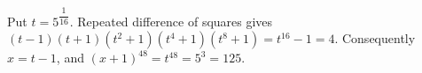 Put $t=5^{\dfrac{1}{16}}$. Repeated difference of squares gives $(t-1)(t+1)(t^2+1)(t^4+1)(t^8+1)=t^{16}-1=4$. Consequently $x=t-1$, and $(x+1)^{48}=t^{48}=5^3=\boxed{125}$.
